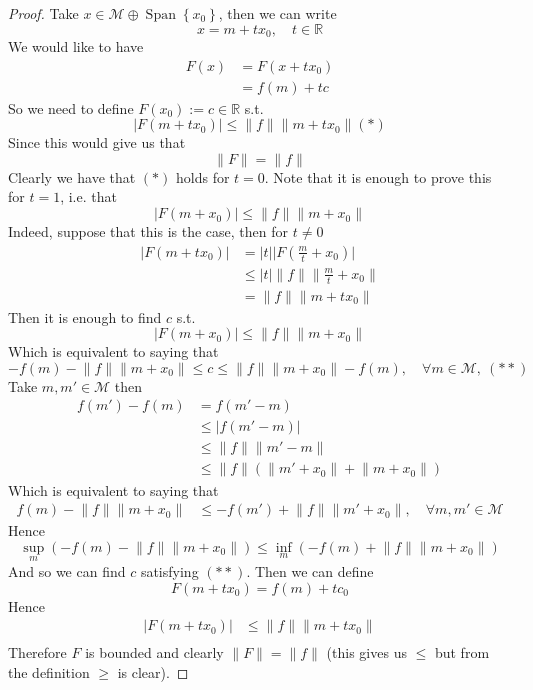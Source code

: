 \documentclass[11pt,a4paper]{article}
\theoremstyle{definition}
\theoremstyle{plain}
\theoremstyle{remark}
\newcommand{\R}{\mathbb{R}}
\renewcommand{\set}[1]{\left\{ #1 \right\}}
\newcommand{\abs}[1]{\lvert #1 \rvert}
\newcommand{\norm}[1]{\lVert #1 \rVert}
\newcommand{\1}{\mathbbm{1}}
\newcommand{\Span}{\operatorname{Span}}
\begin{document}
\begin{proof}
    Take $x \in \mathcal{M} \oplus \Span \set{x_0}$, then we can write 
    $$x = m + tx_0, \quad t \in \R$$
    We would like to have 
    \begin{align*}
        F(x) &= F(x + tx_0) \\
        &= f(m) + t c
    \end{align*}
    So we need to define $F(x_0) := c \in \R$ s.t. 
    $$\abs{F(m + tx_0)} \le \norm{f} \norm{m + t x_0} (*)$$
    Since this would give us that 
    $$\norm{F} = \norm{f}$$
    Clearly we have that $(*)$ holds for $t = 0$. 
    Note that it is enough to prove this for $t=1$, i.e. that 
    $$\abs{F(m + x_0)} \le \norm{f} \norm{m + x_0}$$
    Indeed, suppose that this is the case, then for $t \ne 0$
    \begin{align*}
        \abs{F(m + tx_0)} &=  \abs{t} \abs{F(\frac{m}{t} + x_0)} \\
        &\le \abs{t} \norm{f} \norm{\frac{m}{t} + x_0} \\
        &= \norm{f} \norm{m + tx_0}
    \end{align*} 
    Then it is enough to find $c$ s.t. 
    $$\abs{F(m + x_0)} \le \norm{f} \norm{m + x_0}$$
    Which is equivalent to saying that 
    $$-f(m) - \norm{f} \norm{m + x_0} \le c \le \norm{f} \norm{m + x_0} - f(m), \quad \forall m \in \mathcal{M}, \ (**)$$
    Take $m, m' \in \mathcal{M}$ then 
    \begin{align*}
        f(m') - f(m) &= f(m' - m) \\
        &\le \abs{f(m' - m)} \\
        &\le \norm{f} \norm{m' - m} \\
        &\le \norm{f} \left(\norm{m' + x_0} + \norm{m + x_0}\right)
    \end{align*}
    Which is equivalent to saying that 
    \begin{align*}
        f(m) - \norm{f} \norm{m + x_0} &\le - f(m') + \norm{f} \norm{m' + x_0}, \quad \forall m,m' \in \mathcal{M}
    \end{align*}
    Hence 
    $$\sup_{m} \left(-f(m) - \norm{f} \norm{m+x_0}\right) \le \inf_{m} \left(-f(m) + \norm{f} \norm{m+x_0}\right)$$
    And so we can find $c$ satisfying $(**)$. Then we can define 
    $$F(m + tx_0) = f(m) + tc_0$$
    Hence 
    \begin{align*}
        \abs{F(m + tx_0)} &\le \norm{f} \norm{m + tx_0} \\
    \end{align*}
    Therefore $F$ is bounded and clearly $\norm{F} = \norm{f}$ (this gives us $\le$ but from the definition $\ge$ is clear). 
\end{proof}
\end{document}
